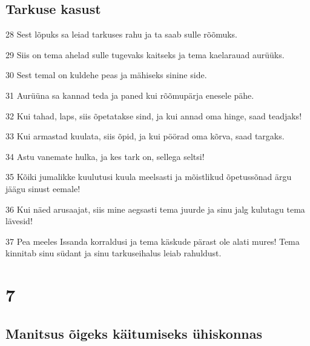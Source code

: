 \section*{Tarkuse kasust}

\par 28 Sest lõpuks sa leiad tarkuses rahu ja ta saab sulle rõõmuks.
\par 29 Siis on tema ahelad sulle tugevaks kaitseks ja tema kaelarauad aurüüks.
\par 30 Sest temal on kuldehe peas ja mähiseks sinine side.
\par 31 Aurüüna sa kannad teda ja paned kui rõõmupärja enesele pähe.
\par 32 Kui tahad, laps, siis õpetatakse sind, ja kui annad oma hinge, saad teadjaks!
\par 33 Kui armastad kuulata, siis õpid, ja kui pöörad oma kõrva, saad targaks.
\par 34 Astu vanemate hulka, ja kes tark on, sellega seltsi!
\par 35 Kõiki jumalikke kuulutusi kuula meelsasti ja mõistlikud õpetussõnad ärgu jäägu sinust eemale!
\par 36 Kui näed arusaajat, siis mine aegsasti tema juurde ja sinu jalg kulutagu tema lävesid!
\par 37 Pea meeles Issanda korraldusi ja tema käskude pärast ole alati mures! Tema kinnitab sinu südant ja sinu tarkuseihalus leiab rahuldust.

\chapter{7}

\section*{Manitsus õigeks käitumiseks ühiskonnas}


